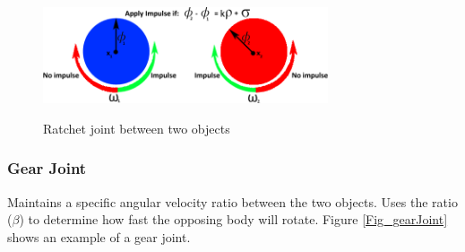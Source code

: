 \documentclass[12pt]{article}
\begin{document}
\begin{figure}[htbp]
\begin{center}
{
 \includegraphics[width=0.75\textwidth]{pictures/ratchetJoint.png}
}
\caption{\label{Fig_ratchetJoint}Ratchet joint between two objects}
\end{center}
\end{figure}

\subsubsection{Gear Joint} \label{SecConstraintFig}
Maintains a specific angular velocity ratio between the two objects. Uses the
ratio ($\beta$) to determine how fast the opposing body will rotate.
Figure \ref{Fig_gearJoint} shows an example of a gear joint.
~\newline
\end{document}
